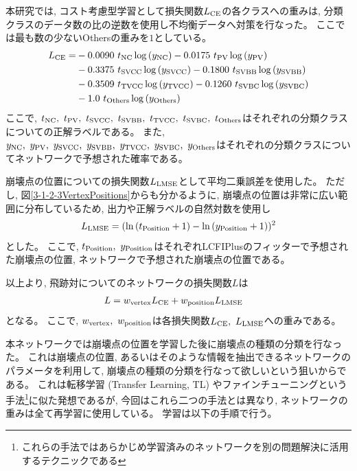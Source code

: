 本研究では, コスト考慮型学習として損失関数$L_{\rm CE}$の各クラスへの重みは, 分類クラスのデータ数の比の逆数を使用し不均衡データへ対策を行なった。
ここでは最も数の少ないOthersの重みを$1$としている。
\begin{equation}
 \begin{split}
 L_{\rm CE} = & - 0.0090\  t_{\rm NC} \log{(y_{\rm NC})} - 0.0175\  t_{\rm PV} \log{(y_{\rm PV})} \\
       & - 0.3375\  t_{\rm SVCC} \log{(y_{\rm SVCC})} - 0.1800\  t_{\rm SVBB} \log{(y_{\rm SVBB})}\\
       & - 0.3509\  t_{\rm TVCC} \log{(y_{\rm TVCC})} - 0.1260\  t_{\rm SVBC} \log{(y_{\rm SVBC})}\\
       & - 1.0\  t_{\rm Others} \log{(y_{\rm Others})}\\
 \end{split}
\end{equation}
ここで, $t_{\rm NC},\ t_{\rm PV},\ t_{\rm SVCC},\ t_{\rm SVBB},\ t_{\rm TVCC},\ t_{\rm SVBC},\ t_{\rm Others}$はそれぞれの分類クラスについての正解ラベルである。
また, $y_{\rm NC},\ y_{\rm PV},\ y_{\rm SVCC},\ y_{\rm SVBB},\ y_{\rm TVCC},\ y_{\rm SVBC},\ y_{\rm Others}$はそれぞれの分類クラスについてネットワークで予想された確率である。

崩壊点の位置についての損失関数$L_{\rm LMSE}$として平均二乗誤差を使用した。
ただし, 図\ref{3-1-2-3VertexPositions}からも分かるように, 崩壊点の位置は非常に広い範囲に分布しているため, 出力や正解ラベルの自然対数を使用し
\begin{equation}
 \begin{split}
 L_{\rm LMSE} = (\ln{(t_{\rm Position}+1)} - \ln{(y_{\rm Position}+1)})^2
 \end{split}
\end{equation}
とした。
ここで, $t_{\rm Position},\ y_{\rm Position}$はそれぞれLCFIPlusのフィッターで予想された崩壊点の位置, ネットワークで予想された崩壊点の位置である。

以上より, 飛跡対についてのネットワークの損失関数$L$は
\begin{equation}
 \begin{split}
 L & = w_{\rm vertex} L_{\rm CE} + w_{\rm position} L_{\rm LMSE}
 \end{split}
\end{equation}
となる。
ここで, $w_{\rm vertex},\ w_{\rm position}$は各損失関数$L_{\rm CE},\ L_{\rm LMSE}$への重みである。

本ネットワークでは崩壊点の位置を学習した後に崩壊点の種類の分類を行なった。
これは崩壊点の位置, あるいはそのような情報を抽出できるネットワークのパラメータを利用して, 崩壊点の種類の分類を行なって欲しいという狙いからである。
これは転移学習 (Transfer Learning, TL) やファインチューニングという手法\footnote{これらの手法ではあらかじめ学習済みのネットワークを別の問題解決に活用するテクニックである}に似た発想であるが, 今回はこれら二つの手法とは異なり, ネットワークの重みは全て再学習に使用している。
学習は以下の手順で行う。


